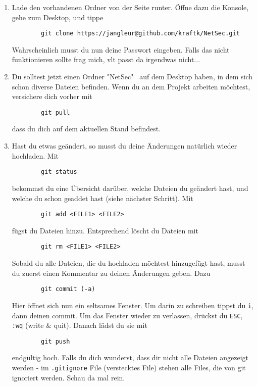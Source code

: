\documentclass[reqno]{article}
\begin{document}
  \begin{enumerate}
  	\item Lade den vorhandenen Ordner von der Seite runter. Öffne dazu die Konsole, gehe zum Desktop, und tippe
  	  \begin{verbatim}
  	    git clone https://jangleur@github.com/kraftk/NetSec.git
  	  \end{verbatim}
  	  Wahrscheinlich musst du nun deine Passwort eingeben. Falls das nicht funktionieren sollte frag mich, vlt passt da irgendwas nicht...
  	\item Du solltest jetzt einen Ordner "NetSec" \, auf dem Desktop haben, in dem sich schon diverse Dateien befinden. Wenn du an dem Projekt arbeiten möchtest, versichere dich vorher mit 
  	  \begin{verbatim}
  	    git pull
  	  \end{verbatim}
  	  dass du dich auf dem aktuellen Stand befindest.
  	\item Hast du etwas geändert, so musst du deine Änderungen natürlich wieder hochladen. Mit
  	  \begin{verbatim}
  	    git status
  	  \end{verbatim}
      bekommst du eine Übersicht darüber, welche Dateien du geändert hast, und welche du schon geaddet hast (siehe nächster Schritt). Mit
      \begin{verbatim}
        git add <FILE1> <FILE2>
      \end{verbatim}
      fügst du Dateien hinzu. Entsprechend löscht du Dateien mit
      \begin{verbatim}
        git rm <FILE1> <FILE2>
      \end{verbatim} 
      Sobald du alle Dateien, die du hochladen möchtest hinzugefügt hast, musst du zuerst einen Kommentar zu deinen Änderungen geben. Dazu
      \begin{verbatim}
        git commit (-a)
      \end{verbatim}
      Hier öffnet sich nun ein seltsames Fenster. Um darin zu schreiben tippst du \texttt{i}, dann deinen commit. Um das Fenster wieder zu verlassen, drückst du \texttt{ESC}, \texttt{:wq} (write \& quit). Danach lädst du sie mit
      \begin{verbatim}
        git push
      \end{verbatim}
      endgültig hoch. Falls du dich wunderst, dass dir nicht alle Dateien angezeigt werden - im \texttt{.gitignore} File (verstecktes File) stehen alle Files, die von git ignoriert werden. Schau da mal rein.
  \end{enumerate}
\end{document}
